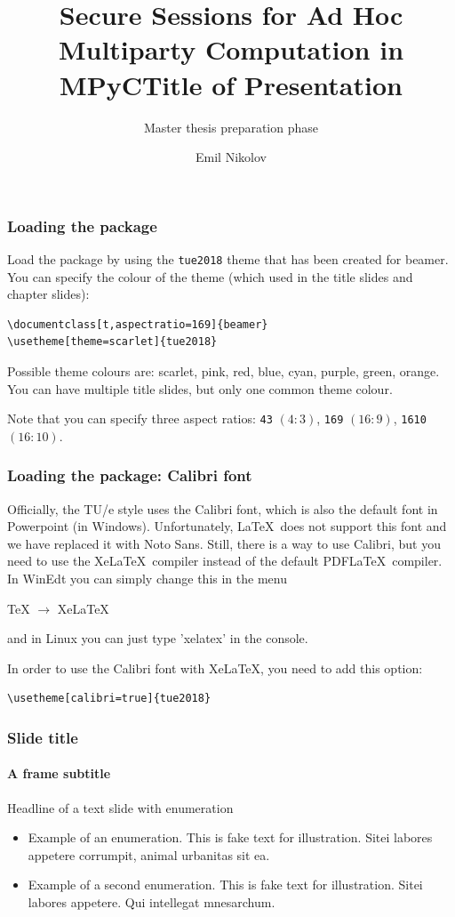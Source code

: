 \documentclass[t,aspectratio=169]{beamer}
\title{Secure Sessions for Ad Hoc Multiparty Computation in MPyC}
\subtitle{Master thesis preparation phase}
\author{Emil Nikolov}
\begin{document}
\begin{titleframe}[variant=1,bgimage=titlebgimg.jpg]
\end{titleframe}

\title{Title of Presentation}

\begin{titleframe}[variant=2,bgimage=titlebgimg.jpg]
\end{titleframe}

\begin{frame}[fragile]
  \frametitle{Loading the package}
  
  Load the package by using the \verb|tue2018| theme that has been created for beamer. You can specify the colour of the theme (which used in the title slides and chapter slides):
  
  \begin{verbatim}
\documentclass[t,aspectratio=169]{beamer}
\usetheme[theme=scarlet]{tue2018}
\end{verbatim}
  
  Possible theme colours are: scarlet, pink, red, blue, cyan, purple, green, orange. You can have multiple title slides, but only one common theme colour.
  
  Note that you can specify three aspect ratios: \verb|43| $(4:3)$, \verb|169| $(16:9)$, \verb|1610| $(16:10)$.
\end{frame}

\begin{frame}[fragile]
  \frametitle{Loading the package: Calibri font}
  
  Officially, the TU/e style uses the Calibri font, which is also the default font in Powerpoint (in Windows). Unfortunately, \LaTeX\ does not support this font and we have replaced it with Noto Sans. Still, there is a way to use Calibri, but you need to use the Xe\LaTeX\ compiler instead of the default PDF\LaTeX\ compiler. In WinEdt you can simply change this in the menu
  
  \bigskip
  TeX $\rightarrow$ XeLaTeX
  
  \bigskip
  and in Linux you can just type 'xelatex' in the console. 
  
  \bigskip
  In order to use the Calibri font with Xe\LaTeX, you need to add this option:
  
  \begin{verbatim}
\usetheme[calibri=true]{tue2018}
\end{verbatim}
\end{frame}


\begin{frame}
  \frametitle{Slide title}
  \framesubtitle{A frame subtitle}
  Headline of a text slide with enumeration
  \begin{itemize}
    \item Example of an enumeration. This is fake text for illustration. Sitei labores appetere corrumpit, animal urbanitas sit ea.
    \item Example of a second enumeration. This is fake text for illustration. Sitei labores appetere. Qui intellegat mnesarchum.
  \end{itemize}
\end{frame}
\end{document}
